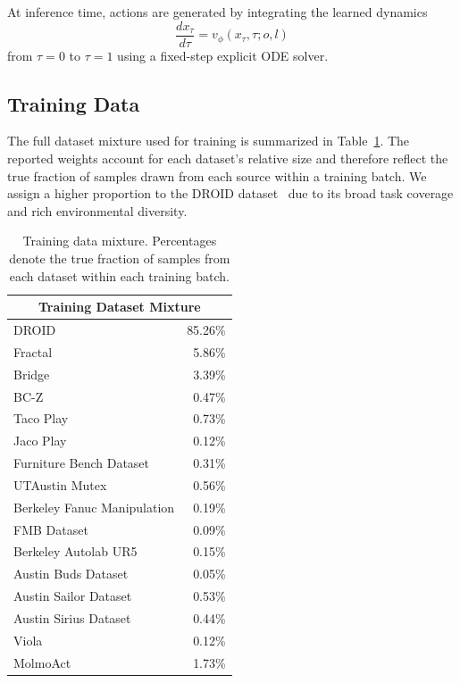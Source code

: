 At inference time, actions are generated by integrating the learned dynamics
\[
\frac{dx_\tau}{d\tau} = v_\phi(x_\tau,\tau; o, l)
\]
from $\tau=0$ to $\tau=1$ using a fixed-step explicit ODE solver.


\subsection{Training Data} 
The full dataset mixture used for training is summarized in Table~\ref{tab:data_mix}. The reported weights account for each dataset’s relative size and therefore reflect the true fraction of samples drawn from each source within a training batch. We assign a higher proportion to the DROID dataset~\cite{khazatsky2025droidlargescaleinthewildrobot} due to its broad task coverage and rich environmental diversity.

\begin{table}[th]
    \centering
    \caption{Training data mixture. Percentages denote the true fraction of samples from each dataset within each training batch.}
    
    \begin{tabular}{lr}
        \toprule
        \multicolumn{2}{c}{\textbf{Training Dataset Mixture}}\\
        \midrule
        DROID \cite{khazatsky2025droidlargescaleinthewildrobot} & 85.26\% \\
        Fractal \cite{brohan2023rt1roboticstransformerrealworld} & 5.86\% \\
        Bridge \cite{walke2024bridgedatav2datasetrobot} & 3.39\% \\
        BC-Z \cite{pmlr-v164-jang22a} & 0.47\% \\
        Taco Play \cite{mees2023groundinglanguagevisualaffordances} & 0.73\% \\
        Jaco Play \cite{dass2023jacoplay} & 0.12\% \\
        Furniture Bench Dataset \cite{heo2023furniturebenchreproduciblerealworldbenchmark} & 0.31\% \\
        UTAustin Mutex \cite{shah2023mutex} & 0.56\% \\
        Berkeley Fanuc Manipulation \cite{zhu2023fanuc} & 0.19\% \\
        FMB Dataset \cite{luo2024fmbfunctionalmanipulationbenchmark} & 0.09\% \\
        Berkeley Autolab UR5 \cite{BerkeleyUR5Website} & 0.15\% \\
        Austin Buds Dataset \cite{zhu2022bottomupskilldiscoveryunsegmented} & 0.05\% \\
        Austin Sailor Dataset \cite{nasiriany2022sailor} & 0.53\% \\
        Austin Sirius Dataset \cite{liu2023robotlearningjobhumanintheloop} & 0.44\% \\
        Viola \cite{zhu2023violaimitationlearningvisionbased} & 0.12\% \\
        MolmoAct \cite{lee2025molmoactactionreasoningmodels} & 1.73\% \\
        \bottomrule
    \end{tabular}
    \label{tab:data_mix}
\end{table}


